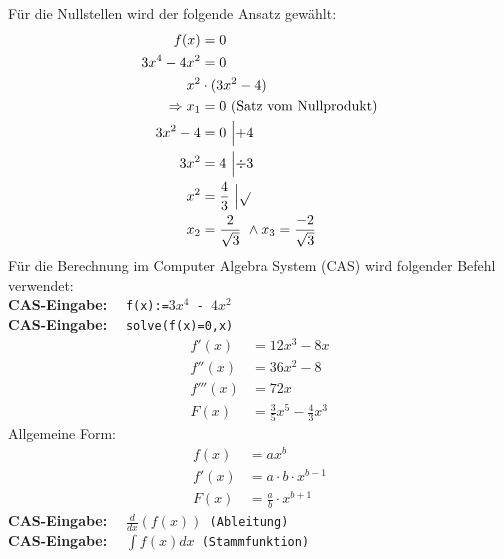 \documentclass[12pt,a4paper]{report}
\newenvironment{gblock}[1]{
    \tcolorbox[beamer,
        noparskip,
        colback=green!50!,
        colbacklower=green!75!green,
        title=#1]}
{\endtcolorbox}
\newcommand{\cas}[1]{\textbf{CAS-Eingabe: }\ \ \texttt{#1}}
\begin{document}
	\begin{gblock}{Nullstellen}
		Für die Nullstellen wird der folgende Ansatz gewählt:
		\begin{align*}
			f(x) &= 0 \\
			3x^4 - 4x^2 &= 0 \\
			x^2 &\cdot (3x^2 - 4) \\
			\Rightarrow x_1 &= 0\ \text{(Satz vom Nullprodukt)} \\
			3x^2 - 4 &= 0\ \Bigl| +4 \\
			3x^2 &= 4\ \Bigl|\div 3 \\
			x^2 &= \frac{4}{3}\ \Bigl|\sqrt{} \\
			x_2 &= \frac{2}{\sqrt{3}}\ \land x_3 = \frac{-2}{\sqrt{3}}
		\end{align*}
		Für die Berechnung im Computer Algebra System (CAS) wird folgender Befehl verwendet: \\
		\cas{f(x):=$3x^4$ - $4x^2$} \\
		\cas{solve(f(x)=0,x)}
	\end{gblock}
	\begin{gblock}{Ableitungen und Stammfunktion}
		\begin{align*}
			f'(x) &= 12x^3 -8x \\
			f''(x) &= 36x^2 - 8 \\
			f'''(x) &= 72x \\
			F(x) &= \frac{3}{5}x^5 - \frac{4}{3}x^3
		\end{align*}
		Allgemeine Form:
		\begin{align*}
			f(x) &= ax^b \\
			f'(x) &= a \cdot b \cdot x^{b-1} \\
			F(x) &= \frac{a}{b}\cdot x^{b+1}
		\end{align*}
		\cas{$\frac{d}{dx}(f(x))$   (Ableitung)} \\
		\cas{$\int f(x) dx$   (Stammfunktion)}
	\end{gblock}
\end{document}
